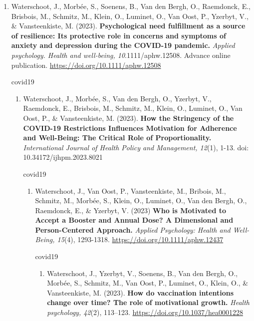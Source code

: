 \documentclass[
  twocolumn]{article}
\providecommand{\tightlist}{%
  \setlength{\itemsep}{0pt}\setlength{\parskip}{0pt}}
\begin{document}
\begin{enumerate}
\def\labelenumi{\arabic{enumi}.}
\setcounter{enumi}{31}
\tightlist
\item
  Waterschoot, J., Morbée, S., Soenens, B., Van den Bergh, O.,
  Raemdonck, E., Brisbois, M., Schmitz, M., Klein, O., Luminet, O., Van
  Oost, P., Yzerbyt, V., \& Vansteenkiste, M. (2023).
  \textbf{Psychological need fulfillment as a source of resilience: Its
  protective role in concerns and symptoms of anxiety and depression
  during the COVID-19 pandemic.} \emph{Applied psychology. Health and
  well-being, 10}.1111/aphw.12508. Advance online publication.
  \url{https://doi.org/10.1111/aphw.12508}

  covid19

  \begin{enumerate}
  \def\labelenumii{\arabic{enumii}.}
  \setcounter{enumii}{30}
  \tightlist
  \item
    Waterschoot, J., Morbée, S., Van den Bergh, O., Yzerbyt, V.,
    Raemdonck, E., Brisbois, M., Schmitz, M., Klein, O., Luminet, O.,
    Van Oost, P., \& Vansteenkiste, M. (2023). \textbf{How the
    Stringency of the COVID-19 Restrictions Influences Motivation for
    Adherence and Well-Being: The Critical Role of Proportionality.}
    \emph{International Journal of Health Policy and Management, 12}(1),
    1-13. doi: 10.34172/ijhpm.2023.8021

    covid19

    \begin{enumerate}
    \def\labelenumiii{\arabic{enumiii}.}
    \setcounter{enumiii}{29}
    \tightlist
    \item
      Waterschoot, J., Van Oost, P., Vansteenkiste, M., Bribois, M.,
      Schmitz, M., Morbée, S., Klein, O., Luminet, O., Van den Bergh,
      O., Raemdonck, E., \& Yzerbyt, V. (2023) \textbf{Who is Motivated
      to Accept a Booster and Annual Dose? A Dimensional and
      Person-Centered Approach.} \emph{Applied Psychology: Health and
      Well-Being, 15}(4), 1293-1318.
      \url{https://doi.org/10.1111/aphw.12437}

      covid19

      \begin{enumerate}
      \def\labelenumiv{\arabic{enumiv}.}
      \setcounter{enumiv}{28}
      \tightlist
      \item
        Waterschoot, J., Yzerbyt, V., Soenens, B., Van den Bergh, O.,
        Morbée, S., Schmitz, M., Van Oost, P., Luminet, O., Klein, O.,
        \& Vansteenkiste, M. (2023). \textbf{How do vaccination
        intentions change over time? The role of motivational growth.}
        \emph{Health psychology, 42}(2), 113--123.
        \url{https://doi.org/10.1037/hea0001228}


\end{enumerate}
\end{enumerate}
\end{enumerate}
\end{enumerate}
\end{document}
